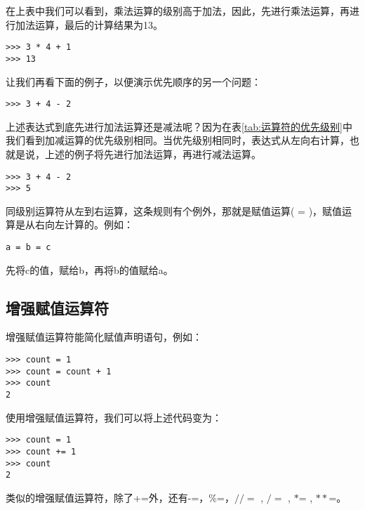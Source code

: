 在上表中我们可以看到，乘法运算的级别高于加法，因此，先进行乘法运算，再进行加法运算，最后的计算结果为13。

\begin{lstlisting}
>>> 3 * 4 + 1
>>> 13
\end{lstlisting}

让我们再看下面的例子，以便演示优先顺序的另一个问题：

\begin{lstlisting}
>>> 3 + 4 - 2
\end{lstlisting}

上述表达式到底先进行加法运算还是减法呢？因为在表\ref{tab:运算符的优先级别}中我们看到加减运算的优先级别相同。当优先级别相同时，表达式从左向右计算，也就是说，上述的例子将先进行加法运算，再进行减法运算。

\begin{lstlisting}
>>> 3 + 4 - 2
>>> 5
\end{lstlisting}

同级别运算符从左到右运算，这条规则有个例外，那就是赋值运算( = )，赋值运算是从右向左计算的。例如：

\begin{lstlisting}
a = b = c
\end{lstlisting}

先将c的值，赋给b，再将b的值赋给a。

\subsection{增强赋值运算符}

增强赋值运算符能简化赋值声明语句，例如：

\begin{lstlisting}
>>> count = 1
>>> count = count + 1
>>> count
2
\end{lstlisting}

使用增强赋值运算符，我们可以将上述代码变为：

\begin{lstlisting}
>>> count = 1
>>> count += 1
>>> count
2
\end{lstlisting}

类似的增强赋值运算符，除了+=外，还有-=，\%=，$//=$  , $/=$  , $*$=  , $**$=。
